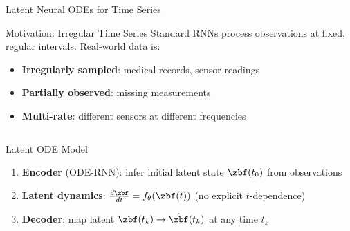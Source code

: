 \documentclass[aspectratio=169,xcolor=dvipsnames,svgnames,x11names,fleqn]{beamer}
\begin{document}
\begin{frame}{Latent Neural ODEs for Time Series}
\scriptsize

\begin{tblockFrost}{Motivation: Irregular Time Series}
Standard RNNs process observations at fixed, regular intervals. Real-world data is:
\begin{itemize}
  \item \textbf{Irregularly sampled}: medical records, sensor readings
  \item \textbf{Partially observed}: missing measurements
  \item \textbf{Multi-rate}: different sensors at different frequencies
\end{itemize}
\end{tblockFrost}
\vspace{4pt}
\begin{columns}
\begin{tblockWing}{Latent ODE Model}
\begin{enumerate}
  \item \textbf{Encoder} (ODE-RNN): infer initial latent state $\zbf(t_0)$ from observations
  \item \textbf{Latent dynamics}: $\frac{d\zbf}{dt} = f_\theta(\zbf(t))$ (no explicit $t$-dependence)
  \item \textbf{Decoder}: map latent $\zbf(t_k) \to \hat{\xbf}(t_k)$ at any time $t_k$
\end{enumerate}
\end{tblockWing}
\end{columns}
\end{frame}
\end{document}
